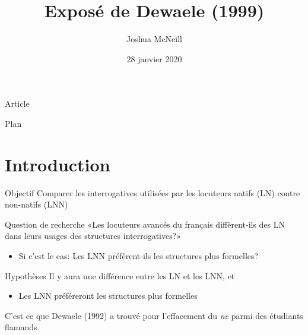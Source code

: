 \documentclass{beamer}
\author{Joshua McNeill}
\date{28 janvier 2020}
\title{Exposé de Dewaele (1999)}
\begin{document}
  \begin{frame}
    \titlepage
  \end{frame}

  \begin{frame}{Article}
  \end{frame}

  \begin{frame}{Plan}
    \tableofcontents
  \end{frame}


  \section{Introduction}
    \begin{frame}
      \begin{block}{Objectif}
        Comparer les interrogatives utilisées par les locuteurs natifs (LN) contre non-natifs (LNN)
      \end{block}
      \begin{block}{Question de recherche}
        «Les locuteurs avancés du français diffèrent-ils des LN dans leurs usages des structures interrogatives?»
        \begin{itemize}
          \item Si c'est le cas: Les LNN préfèrent-ils les structures plus formelles?
        \end{itemize}
      \end{block}
    \end{frame}

    \begin{frame}
      \begin{block}{Hypothèses}
        Il y aura une différence entre les LN et les LNN, et
        \begin{itemize}
          \item Les LNN préféreront les structures plus formelles
        \end{itemize}
        C'est ce que Dewaele (1992) a trouvé pour l'effacement du \emph{ne} parmi des étudiants flamands
      \end{block}
    \end{frame}
\end{document}

